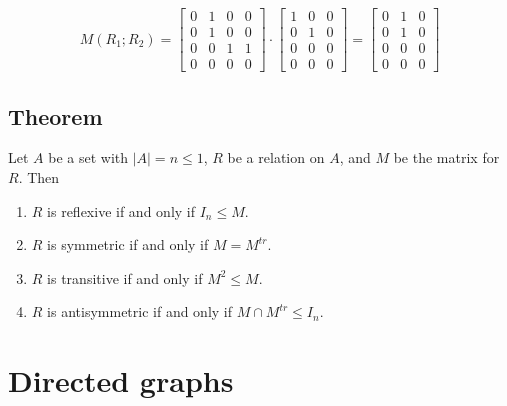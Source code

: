 \documentclass[11pt]{article}
\begin{document}
    \begin{equation*}
        M(R_1;R_2) = \begin{bmatrix}
                        0 & 1 & 0 & 0 \\
                        0 & 1 & 0 & 0 \\
                        0 & 0 & 1 & 1 \\
                        0 & 0 & 0 & 0
                    \end{bmatrix} \cdot \begin{bmatrix}
                                            1 & 0 & 0 \\
                                            0 & 1 & 0 \\
                                            0 & 0 & 0 \\
                                            0 & 0 & 0
                                        \end{bmatrix} = \begin{bmatrix}
                                                            0 & 1 & 0 \\
                                                            0 & 1 & 0 \\
                                                            0 & 0 & 0 \\
                                                            0 & 0 & 0
                                                        \end{bmatrix}
    \end{equation*}

    \subsection{Theorem}

    Let $A$ be a set with \(|A| = n \leq 1\), $R$ be a relation on $A$, and $M$ be the matrix for $R$. Then 
    \begin{enumerate}
        \item $R$ is reflexive if and only if \(I_n \leq M\).
        \item $R$ is symmetric if and only if \(M = M^{tr}\).
        \item $R$ is transitive if and only if \(M^2 \leq M\).
        \item $R$ is antisymmetric if and only if \(M \cap M^{tr} \leq I_n\).
    \end{enumerate}

    \section{Directed graphs}
\end{document}
